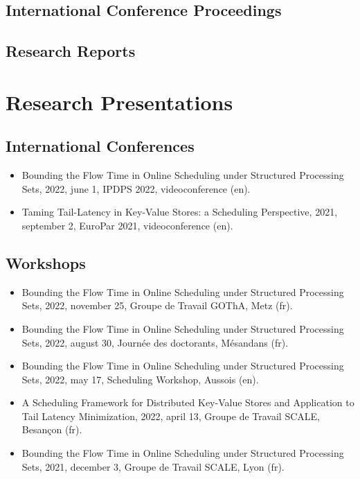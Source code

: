\documentclass[12pt]{article}
\begin{document}
\subsection*{International Conference Proceedings}


\subsection*{Research Reports}




\section*{Research Presentations}

\subsection*{International Conferences}

\begin{itemize}
  \item Bounding the Flow Time in Online Scheduling under Structured Processing Sets, 2022, june 1,
  IPDPS 2022, videoconference (en).
  \item Taming Tail-Latency in Key-Value Stores: a Scheduling Perspective, 2021, september 2,
  EuroPar 2021, videoconference (en).
\end{itemize}

\subsection*{Workshops}

\begin{itemize}
  \item Bounding the Flow Time in Online Scheduling under Structured Processing Sets, 2022, november
  25, Groupe de Travail GOThA, Metz (fr).
  \item Bounding the Flow Time in Online Scheduling under Structured Processing Sets, 2022, august
  30, Journée des doctorants, Mésandans (fr).
  \item Bounding the Flow Time in Online Scheduling under Structured Processing Sets, 2022, may 17,
  Scheduling Workshop, Aussois (en).
  \item A Scheduling Framework for Distributed Key-Value Stores and Application to Tail Latency
  Minimization, 2022, april 13, Groupe de Travail SCALE, Besançon (fr).
  \item Bounding the Flow Time in Online Scheduling under Structured Processing Sets, 2021, december
  3, Groupe de Travail SCALE, Lyon (fr).
\end{itemize}

% 
% 
\end{document}

